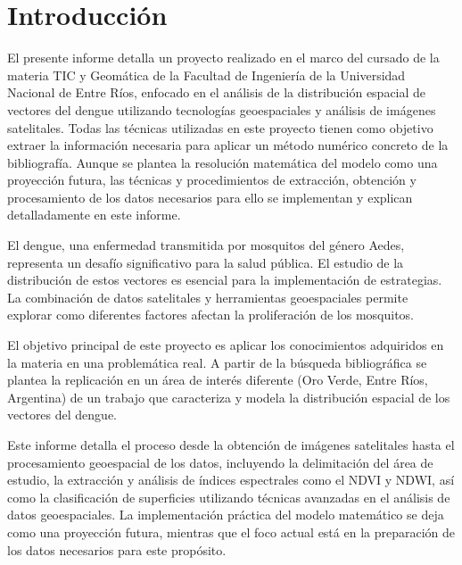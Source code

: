 \section{Introducción}

El presente informe detalla un proyecto realizado en el marco del cursado de la materia TIC y Geomática de la Facultad de Ingeniería de la Universidad Nacional de Entre Ríos, enfocado en el análisis de la distribución espacial de vectores del dengue utilizando tecnologías geoespaciales y análisis de imágenes satelitales. Todas las técnicas utilizadas en este proyecto tienen como objetivo extraer la información necesaria para aplicar un método numérico concreto de la bibliografía. Aunque se plantea la resolución matemática del modelo como una proyección futura, las técnicas y procedimientos de extracción, obtención y procesamiento de los datos necesarios para ello se implementan y explican detalladamente en este informe.

El dengue, una enfermedad transmitida por mosquitos del género Aedes, representa un desafío significativo para la salud pública. El estudio de la distribución de estos vectores es esencial para la implementación de estrategias. La combinación de datos satelitales y herramientas geoespaciales permite explorar como diferentes factores afectan la proliferación de los mosquitos.

El objetivo principal de este proyecto es aplicar los conocimientos adquiridos en la materia en una problemática real. A partir de la búsqueda bibliográfica se plantea la replicación en un área de interés diferente (Oro Verde, Entre Ríos, Argentina) de un trabajo que caracteriza y modela la distribución espacial de los vectores del dengue.

Este informe detalla el proceso desde la obtención de imágenes satelitales hasta el procesamiento geoespacial de los datos, incluyendo la delimitación del área de estudio, la extracción y análisis de índices espectrales como el NDVI y NDWI, así como la clasificación de superficies utilizando técnicas avanzadas en el análisis de datos geoespaciales. La implementación práctica del modelo matemático se deja como una proyección futura, mientras que el foco actual está en la preparación de los datos necesarios para este propósito.